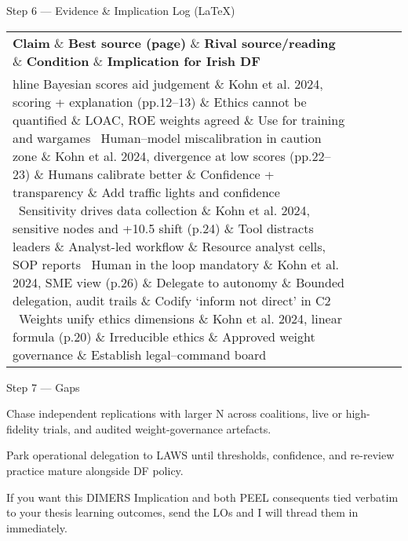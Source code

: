 Step 6 — Evidence \& Implication Log (LaTeX)

\begin{tabular}{p{3.2cm}p{4.2cm}p{3.6cm}p{3.2cm}p{4.2cm}}
	\textbf{Claim} \& \textbf{Best source (page)} \& \textbf{Rival source/reading} \& \textbf{Condition} \& \textbf{Implication for Irish DF}\\hline
	Bayesian scores aid judgement \& Kohn et al. 2024, scoring + explanation (pp.12–13) \& Ethics cannot be quantified \& LOAC, ROE weights agreed \& Use for training and wargames \
	Human–model miscalibration in caution zone \& Kohn et al. 2024, divergence at low scores (pp.22–23) \& Humans calibrate better \& Confidence + transparency \& Add traffic lights and confidence \
	Sensitivity drives data collection \& Kohn et al. 2024, sensitive nodes and +10.5 shift (p.24) \& Tool distracts leaders \& Analyst-led workflow \& Resource analyst cells, SOP reports \
	Human in the loop mandatory \& Kohn et al. 2024, SME view (p.26) \& Delegate to autonomy \& Bounded delegation, audit trails \& Codify ‘inform not direct’ in C2 \
	Weights unify ethics dimensions \& Kohn et al. 2024, linear formula (p.20) \& Irreducible ethics \& Approved weight governance \& Establish legal–command board \
\end{tabular}

Step 7 — Gaps

Chase independent replications with larger N across coalitions, live or high-fidelity trials, and audited weight-governance artefacts.

Park operational delegation to LAWS until thresholds, confidence, and re-review practice mature alongside DF policy.

If you want this DIMERS Implication and both PEEL consequents tied verbatim to your thesis learning outcomes, send the LOs and I will thread them in immediately.

\parencite{VOWELL_2024}
